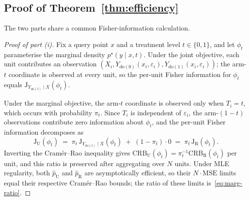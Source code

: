 \documentclass[11pt]{article}
\begin{document}
\subsection{Proof of Theorem~\ref{thm:efficiency}}

The two parts share a common Fisher-information calculation.

\begin{proof}[Proof of part (i)]
Fix a query point $x$ and a treatment level $t \in \{0, 1\}$, and let
$\phi_{t}$ parameterise the marginal density
$p^{\star}(y \mid x, t)$. Under the joint objective, each unit
contributes an observation $(X_{i}, Y_{\mathrm{do}(0)}(x_{i},
\varepsilon_{i}), Y_{\mathrm{do}(1)}(x_{i}, \varepsilon_{i}))$; the
arm-$t$ coordinate is observed at every unit, so the per-unit Fisher
information for $\phi_{t}$ equals $\mathrm{J}_{Y_{\mathrm{do}(t)}
\mid X}(\phi_{t})$.

Under the marginal objective, the arm-$t$ coordinate is observed only
when $T_{i} = t$, which occurs with probability $\pi_{t}$. Since
$T_{i}$ is independent of $\varepsilon_{i}$, the arm-$(1 - t)$
observations contribute zero information about $\phi_{t}$, and the
per-unit Fisher information decomposes as
\begin{equation*}
  \mathrm{J}_{\mathrm{U}}(\phi_{t})
  \;=\;
  \pi_{t}\, \mathrm{J}_{Y_{\mathrm{do}(t)} \mid X}(\phi_{t})
  \;+\; (1 - \pi_{t}) \cdot 0
  \;=\;
  \pi_{t}\, \mathrm{J}_{\mathrm{R}}(\phi_{t}).
\end{equation*}
Inverting the Cram\'er--Rao inequality gives
$\mathrm{CRB}_{\mathrm{U}}(\phi_{t}) = \pi_{t}^{-1}
\mathrm{CRB}_{\mathrm{R}}(\phi_{t})$ per unit, and this ratio is
preserved after aggregating over $N$ units. Under MLE regularity, both
$\hat{p}_{\mathrm{U}}$ and $\hat{p}_{\mathrm{R}}$ are asymptotically
efficient, so their $N \cdot \mathrm{MSE}$ limits equal their
respective Cram\'er--Rao bounds; the ratio of these limits
is~\eqref{eq:marg-ratio}.
\end{proof}
\end{document}
